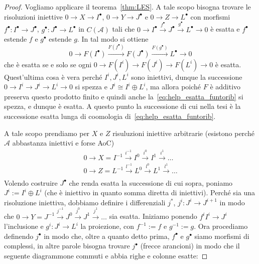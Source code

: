 \begin{proof}{}
    Vogliamo applicare il teorema~\ref{thm:LES}. A tale scopo bisogna trovare le
    risoluzioni iniettive \(0 \to X \to I^\bullet\), \(0 \to Y \to J^\bullet\) e
    \(0 \to Z \to L^\bullet\) con morfismi \(f^\bullet : I^\bullet \to
    J^\bullet\), \(g^\bullet : J^\bullet \to L^\bullet\) in \(C{(\mathcal{A})}\)
    tali che \(0 \to I^\bullet \overset{f^\bullet}{\to} J^\bullet
    \overset{g^\bullet}{\to} L^\bullet \to 0\) è esatta e \(f^\bullet\) estende
    \(f\) e \(g^\bullet\) estende \(g\). In tal modo si ottiene
    \begin{equation}\label{eq:help_esatta_funtorib} 0 \to
    F{(I^\bullet)} \overset{F{(f^\bullet)}}{\to} F{(J^\bullet)}
    \overset{F{(g^\bullet)}}{\to} L^\bullet \to 0\end{equation} che è esatta se
    e solo se ogni \(0 \to F{(I^{i})} \to F{(J^{i})} \to F{(L^{i})} \to 0\) è
    esatta. Quest'ultima cosa è vera perché \(I^{i}, J^{i}, L^{i}\) sono iniettivi, dunque
    la successione \(0\to I^{i} \to J^{i} \to L^{i} \to 0 \) si spezza e \(J^{i}
    \cong I^{i} \oplus L^{i}\), ma allora poiché \(F\) è additivo preserva
    questo prodotto finito e quindi anche la~\eqref{eq:help_esatta_funtorib} si
    spezza, e dunque è esatta. A questo punto la successione di cui nella tesi è
    la successione esatta lunga di coomologia
    di~\eqref{eq:help_esatta_funtorib}.

    A tale scopo prendiamo per \(X\) e \(Z\) risuluzioni iniettive arbitrarie
    (esistono perché \(\mathcal{A}\) abbastanza iniettivi e forse AoC)
    \begin{align*}
        0 \to X = I^{-1} \overset{i^{-1}}{\to} I^{0} \overset{i^{0}}{\to} I^{1}
        \overset{i^{1}}{\to} \dots \\
        0 \to Z = L^{-1} \overset{l^{-1}}{\to} L^{0} \overset{l^{0}}{\to} L^{1}
        \overset{l^{1}}{\to} \dots \\
    \end{align*}
    Volendo costruire \(J^\bullet\) che
    renda esatta la successione di cui sopra, poniamo \(J^{i} := I^{i}
    \oplus L^{i}\) (che è iniettivo in quanto somma diretta di iniettivi).
    Perché sia una risoluzione iniettiva, dobbiamo definire i differenziali
    \(j^{*}\), \(j^{i} : J^{i} \to J^{i+1}\) in modo che \(0 \to Y = J^{-1}
    \overset{j^{-1}}{\to} J^{0} \overset{j^{0}}{\to} J^{1} \overset{j^{1}}{\to}
    \dots\) sia esatta. 
    Iniziamo ponendo \(f^{i} I^{i} \to J^{i}\) l'inclusione e \(g^{i} : J^{i}
    \to L^{i}\) la proiezione, con \(f^{-1} := f\) e \(g^{-1} := g\). Ora
    procediamo definendo \(j^\bullet\) in modo che, oltre a quanto detto prima,
    \(f^\bullet\) e \(g^\bullet\) siamo morfismi di complessi, in altre parole
    bisogna trovare \(j^\bullet\) (frecce arancioni) in modo che 
    il seguente diagrammone commuti e abbia righe e colonne esatte:


\end{proof}
